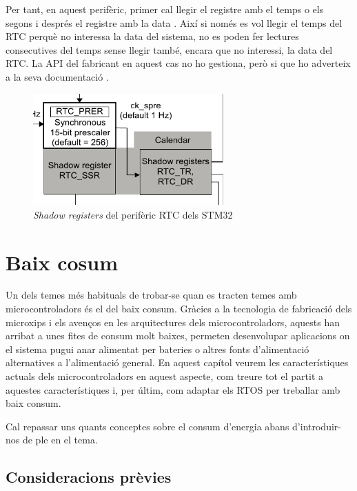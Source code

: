 Per tant, en aquest perifèric, primer cal llegir el registre amb el temps o els segons i després el registre amb la data \cite[800-805]{STM32F4RM}. Així si només es vol llegir el temps del RTC perquè no interessa la data del sistema, no es poden fer lectures consecutives del temps sense llegir també, encara que no interessi, la data del RTC. La API del fabricant en aquest cas no ho gestiona, però si que ho adverteix a la seva documentació \cite[719]{STM32UM1725}.

\begin{figure}
 \centering
 \includegraphics[width=0.65\textwidth, keepaspectratio]{imatges/ShadowRegisters.png}
 \caption{{\em Shadow registers} del perifèric RTC dels STM32 \cite[800]{STM32F4RM}}
 \label{fig:ShadowRegisters}
\end{figure}


\chapter{Baix cosum}
\label{ch:low-power}
Un dels temes més habituals de trobar-se quan es tracten temes amb microcontroladors és el del baix consum. Gràcies a la tecnologia de fabricació dels microxips i els avenços en les arquitectures dels microcontroladors, aquests han arribat a unes fites de consum molt baixes, permeten desenvolupar aplicacions on el sistema pugui anar alimentat per bateries o altres fonts d'alimentació alternatives a l'alimentació general. En aquest capítol veurem les característiques actuals dels microcontroladors en aquest aspecte, com treure tot el partit a aquestes característiques i, per últim, com adaptar els \gls{RTOS} per treballar amb baix consum.

Cal repassar uns quants conceptes sobre el consum d'energia abans d'introduir-nos de ple en el tema.

\section{Consideracions prèvies}
\label{sec:lowpowerintro}

